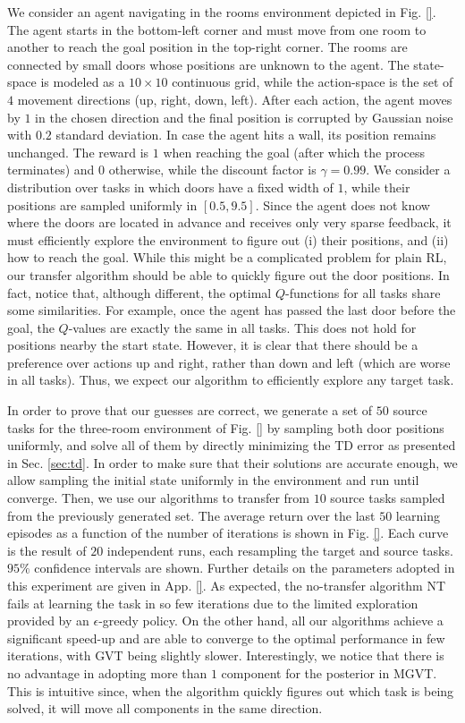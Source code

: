 \documentclass{article}
\begin{document}
We consider an agent navigating in the rooms environment depicted in Fig. \ref{}. The agent starts in the bottom-left corner and must move from one room to another to reach the goal position in the top-right corner. The rooms are connected by small doors whose positions are unknown to the agent. The state-space is modeled as a $10 \times 10$ continuous grid, while the action-space is the set of $4$ movement directions (up, right, down, left). After each action, the agent moves by $1$ in the chosen direction and the final position is corrupted by Gaussian noise with $0.2$ standard deviation. In case the agent hits a wall, its position remains unchanged. The reward is $1$ when reaching the goal (after which the process terminates) and $0$ otherwise, while the discount factor is $\gamma = 0.99$. We consider a distribution over tasks in which doors have a fixed width of $1$, while their positions are sampled uniformly in $[0.5,9.5]$. Since the agent does not know where the doors are located in advance and receives only very sparse feedback, it must efficiently explore the environment to figure out (i) their positions, and (ii) how to reach the goal. While this might be a complicated problem for plain RL, our transfer algorithm should be able to quickly figure out the door positions. In fact, notice that, although different, the optimal $Q$-functions for all tasks share some similarities. For example, once the agent has passed the last door before the goal, the $Q$-values are exactly the same in all tasks. This does not hold for positions nearby the start state. However, it is clear that there should be a preference over actions up and right, rather than down and left (which are worse in all tasks). Thus, we expect our algorithm to efficiently explore any target task.

In order to prove that our guesses are correct, we generate a set of $50$ source tasks for the three-room environment of Fig. \ref{} by sampling both door positions uniformly, and solve all of them by directly minimizing the TD error as presented in Sec. \ref{sec:td}. In order to make sure that their solutions are accurate enough, we allow sampling the initial state uniformly in the environment and run until converge. Then, we use our algorithms to transfer from $10$ source tasks sampled from the previously generated set. The average return over the last $50$ learning episodes as a function of the number of iterations is shown in Fig. \ref{}. Each curve is the result of $20$ independent runs, each resampling the target and source tasks. $95\%$ confidence intervals are shown. Further details on the parameters adopted in this experiment are given in App. \ref{}. As expected, the no-transfer algorithm NT fails at learning the task in so few iterations due to the limited exploration provided by an $\epsilon$-greedy policy. On the other hand, all our algorithms achieve a significant speed-up and are able to converge to the optimal performance in few iterations, with GVT being slightly slower. Interestingly, we notice that there is no advantage in adopting more than $1$ component for the posterior in MGVT. This is intuitive since, when the algorithm quickly figures out which task is being solved, it will move all components in the same direction.
\end{document}
